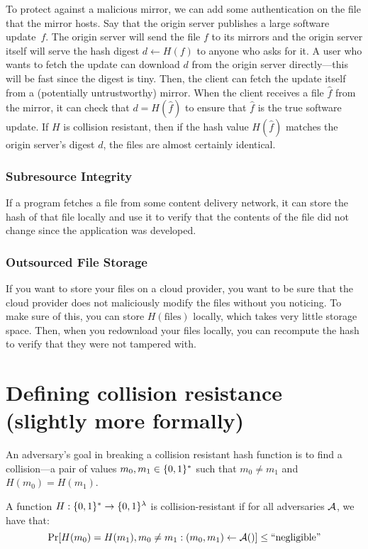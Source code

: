 To protect against a malicious mirror, we can add some authentication on the file that the mirror hosts.
Say that the origin server publishes a large software update~$f$.
The origin server will send the file $f$ to its mirrors and the origin
server itself will serve the hash digest $d\gets H(f)$ to anyone who asks for it.
A user who wants to fetch the update can download $d$ from the origin server directly---this
will be fast since the digest is tiny.
Then, the client can fetch the update itself from a (potentially untrustworthy) mirror.
When the client receives a file $\hat f$ from the mirror, it can check that $d = H(\hat f)$
to ensure that $\hat f$ is the true software update.
If $H$ is collision resistant, then if the hash value $H(\hat f)$ matches the origin server's digest $d$,
the files are almost certainly identical.

\subsubsection{Subresource Integrity}
If a program fetches a file from some content
delivery network, it can store the hash of that
file locally and use it to verify that the
contents of the file did not change since the
application was developed.

\subsubsection{Outsourced File Storage}
If you want to store your files on a cloud
provider, you want to be sure that the cloud
provider does not maliciously modify the files
without you noticing. To make sure of this, you
can store $H(\text{files})$ locally, which takes
very little storage space. Then, when you
redownload your files locally, you can recompute
the hash to verify that they were not tampered
with.

\section{Defining collision resistance (slightly more formally)}
An adversary's goal in breaking a collision
resistant hash function is to find a collision---a
pair of values $m_0, m_1 \in \{0,1\}^*$ such that
$m_0 \neq m_1$ and $H(m_0) = H(m_1)$.

\begin{definition}\label{def:crhf}
	A function $H: \{0,1\}^* \rightarrow \{0,1\}^{\lambda}$ is collision-resistant 
  if for all  adversaries $\mathcal{A}$, we have that:
  \[ \Pr[H(m_0) = H(m_1), m_0 \neq m_1: (m_0, m_1) \leftarrow \mathcal{A}()] \leq \text{``negligible''} \]
\end{definition}

